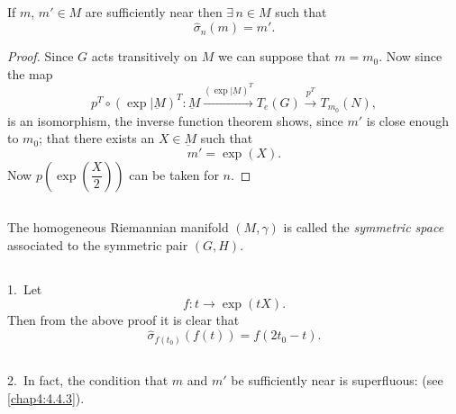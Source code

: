 \setcounter{subsection}{17}

\subsection{}\label{chap3:3.3.18}

\begin{prop*}
If $m$, $m'\in M$ are sufficiently near then $\exists\, n\in M$ such that
$$
\widehat{\sigma}_{n}(m)=m'.
$$
\end{prop*}

\begin{proof}
Since $G$ acts transitively on $M$ we can suppose that $m=m_{0}$. Now
since the map
$$
p^{T}\circ
(\exp|\underbar{M})^{T}:\underbar{M}\xrightarrow{(\exp|\underbar{M})^{T}} T_{e}(G)\xrightarrow{p^{T}}T_{m_{0}}(N),
$$
is an isomorphism, the inverse function theorem shows, since $m'$ is
close enough to $m_{0}$; that there exists an $X\in\underbar{M}$ such
that
$$
m'=\exp(X).
$$
Now $p(\exp(\dfrac{X}{2}))$ can be taken for $n$.
\end{proof}

\setcounter{subsection}{18}
\subsection{}\label{chap3:3.3.19}
The homogeneous Riemannian manifold $(M,\gamma)$ is called the {\em
  symmetric space} associated to the symmetric pair $(G,H)$.

\setcounter{subsection}{19}

\subsection{}\label{chap3:3.3.20}


\begin{remark*}
1.~Let
$$
f:t\to \exp(tX).
$$
Then \pageoriginale from the above proof it is clear that
$$
\widehat{\sigma}_{f(t_{0})}(f(t))=f(2t_{0}-t).
$$
\end{remark*}

\subsection{}\label{chap3:3.3.21}

\begin{remark*}
2.~In fact, the condition that $m$ and $m'$ be sufficiently near is
superfluous: (see \ref{chap4:4.4.3}).
\end{remark*}

